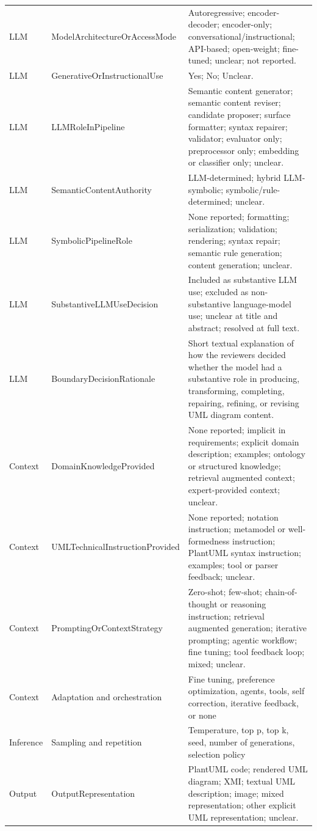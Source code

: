 \begin{longtable}{p{} p{} p{}}
LLM & ModelArchitectureOrAccessMode & Autoregressive; encoder-decoder; encoder-only; conversational/instructional; API-based; open-weight; fine-tuned; unclear; not reported. \\
LLM & GenerativeOrInstructionalUse & Yes; No; Unclear. \\
LLM & LLMRoleInPipeline & Semantic content generator; semantic content reviser; candidate proposer; surface formatter; syntax repairer; validator; evaluator only; preprocessor only; embedding or classifier only; unclear. \\
LLM & SemanticContentAuthority & LLM-determined; hybrid LLM-symbolic; symbolic/rule-determined; unclear. \\
LLM & SymbolicPipelineRole & None reported; formatting; serialization; validation; rendering; syntax repair; semantic rule generation; content generation; unclear. \\
LLM & SubstantiveLLMUseDecision & Included as substantive LLM use; excluded as non-substantive language-model use; unclear at title and abstract; resolved at full text. \\
LLM & BoundaryDecisionRationale & Short textual explanation of how the reviewers decided whether the model had a substantive role in producing, transforming, completing, repairing, refining, or revising UML diagram content. \\
Context & DomainKnowledgeProvided & None reported; implicit in requirements; explicit domain description; examples; ontology or structured knowledge; retrieval augmented context; expert-provided context; unclear. \\
Context & UMLTechnicalInstructionProvided & None reported; notation instruction; metamodel or well-formedness instruction; PlantUML syntax instruction; examples; tool or parser feedback; unclear. \\
Context & PromptingOrContextStrategy & Zero-shot; few-shot; chain-of-thought or reasoning instruction; retrieval augmented generation; iterative prompting; agentic workflow; fine tuning; tool feedback loop; mixed; unclear. \\
Context & Adaptation and orchestration & Fine tuning, preference optimization, agents, tools, self correction, iterative feedback, or none \\
Inference & Sampling and repetition & Temperature, top p, top k, seed, number of generations, selection policy \\
Output & OutputRepresentation & PlantUML code; rendered UML diagram; XMI; textual UML description; image; mixed representation; other explicit UML representation; unclear. \\

\end{longtable}
